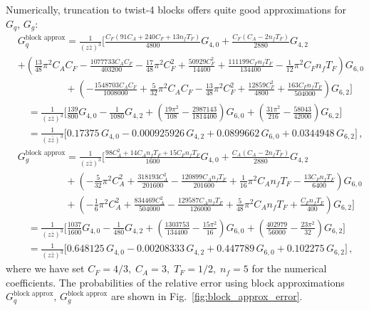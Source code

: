 \documentclass[letterpaper,11pt]{article}
\def\Fig#1{Fig.~{\ref{#1}}}
\DeclareRobustCommand{\Fig}[1]{Fig.~\ref{#1}}
\begin{document}
Numerically, truncation to twist-4 blocks offers quite good approximations for $G_q,\, G_g$:
%
\begin{align}
&G_q^{\text{block approx}} = \frac{1}{(z\bar{z})^3}\Bigg[  
\frac{C_F (91 C_A+240 C_F+13 n_f T_F)}{4800} G_{4,0}  + \frac{C_F (C_A-2 n_f T_F)}{2880} G_{4,2}\nonumber\\
& +\!\left(
\frac{13}{48} \pi ^2 C_A C_F \!-\! \frac{1077733 C_A C_F}{403200} \!-\! \frac{17}{48} \pi ^2 C_F^2\!+\! \frac{50929 C_F^2}{14400}\!+\!\frac{111199 C_F n_f T_F}{134400}\!-\!\frac{1}{12} \pi ^2 C_F n_f T_F
\!\right)G_{6,0} \nonumber\\
&\hspace{2cm}
+\left(
-\frac{1548703 C_A C_F}{1008000}+\frac{5}{32} \pi ^2 C_A C_F-\frac{13}{48} \pi ^2 C_F^2+\frac{12859 C_F^2}{4800}+\frac{163 C_F n_f T_F}{504000}
\right) G_{6,2}
\Bigg]\nonumber\\
&\quad
=\frac{1}{(z\bar{z})^3}\Bigg[ 
\frac{139}{800} G_{4,0}-\frac{1}{1080}G_{4,2}+\left(\frac{19 \pi ^2}{108}-\frac{2987143}{1814400}\right) G_{6,0}+\left(\frac{31 \pi ^2}{216}-\frac{58043}{42000}\right) G_{6,2}
\Bigg]\nonumber\\
&\quad
=\frac{1}{(z\bar{z})^3}\Bigg[ 
0.17375\, G_{4,0}-0.000925926\, G_{4,2}+0.0899662\, G_{6,0}+0.0344948\, G_{6,2}
\Bigg]\,, \label{eq:quark_block_approx}
\end{align}
%
\begin{align}
&G_g^{\text{block approx}} = \frac{1}{(z\bar{z})^3}\Bigg[  
\frac{98 C_A^2+14 C_A n_f T_F+15 C_F n_f T_F}{1600} G_{4,0}
+ \frac{C_A (C_A-2 n_f T_F)}{2880} G_{4,2} \nonumber\\
&\hspace{2cm} + 
\left(
-\frac{5}{32} \pi ^2 C_A^2+\frac{318193 C_A^2}{201600}-\frac{120899 C_A n_f T_F}{201600}+\frac{1}{16} \pi ^2 C_A n_f T_F-\frac{13 C_F n_f T_F}{6400}
\right)G_{6,0} \nonumber\\
&\hspace{2cm}+
\left(
-\frac{1}{6} \pi ^2 C_A^2+\frac{834469 C_A^2}{504000}-\frac{129587 C_A n_f T_F}{126000}+\frac{5}{48} \pi ^2 C_A n_f T_F+\frac{C_F n_f T_F}{400}
\right)G_{6,2} \Bigg] \nonumber\\
& \quad
= \frac{1}{(z\bar{z})^3}
\Bigg[
\frac{1037 }{1600}G_{4,0}-\frac{1}{480} G_{4,2}+\left(\frac{1303753}{134400}-\frac{15 \pi ^2}{16}\right) G_{6,0}+\left(\frac{402979}{56000}-\frac{23 \pi ^2}{32}\right) G_{6,2}
\Bigg]\nonumber\\
& \quad
= \frac{1}{(z\bar{z})^3}
\Bigg[
0.648125\, G_{4,0}-0.00208333\, G_{4,2}+0.447789\, G_{6,0}+0.102275\, G_{6,2}
\Bigg]\,, \label{eq:gluon_block_approx}
\end{align}
%
where we have set $C_F=4/3,\; C_A=3,\; T_F=1/2,\;n_f=5$ for the numerical coefficients.
%
The probabilities of the relative error using block approximations $G_q^{\text{block approx}},\, G_g^{\text{block approx}} $ are shown in \Fig{fig:block_approx_error}. 
\end{document}
